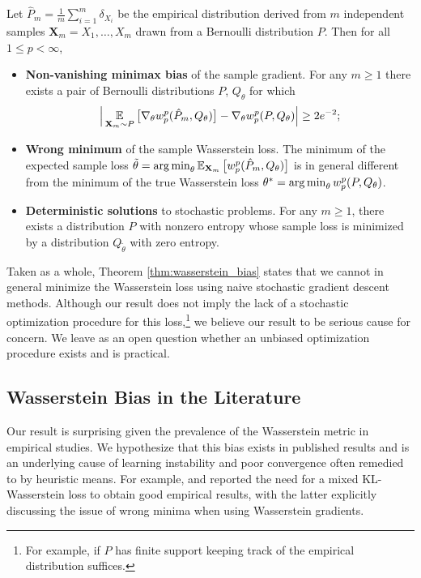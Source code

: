\documentclass{article}
\def \gradtheta {{\grad_\theta}}
\def \batch {\mathbf{X}_m}
\begin{document}
\begin{thm}\label{thm:wasserstein_bias}
Let $\hat P_m=\frac 1m\sum_{i=1}^m \delta_{X_i}$ be the empirical distribution derived from $m$ independent samples $\batch = X_1,\dots, X_m$ drawn from a Bernoulli distribution $P$. Then for all $1 \le p < \infty$,
\begin{itemize}[leftmargin=4ex,topsep=0pt,itemsep=-1ex,partopsep=1ex,parsep=1ex]
\item {\bf Non-vanishing minimax bias} of the sample gradient. For any $m \ge 1$ there exists a pair of Bernoulli distributions $P$, $Q_\theta$ for which
\begin{equation*}
\Big| \expect_{\batch \sim P} \big[ \gradtheta w^p_p(\hat P_m, Q_\theta)\big] - \gradtheta w^p_p(P, Q_\theta) \Big| \ge 2e^{-2};
%
\end{equation*}

\item {\bf Wrong minimum} of the sample Wasserstein loss. The minimum of the expected sample loss $\tilde\theta = \argmin_\theta \expects_{\batch} \big[ w^p_p(\hat P_m, Q_\theta)\big]$ is in general different from the minimum of the true Wasserstein loss $\theta^*=\operatorname*{arg\,min}_\theta w^p_p(P, Q_\theta)$.

\item {\bf Deterministic solutions} to stochastic problems. For any $m \ge 1$, there exists a distribution $P$ with nonzero entropy whose sample loss is minimized by a 
distribution $Q_{\tilde \theta}$ with zero entropy.
\end{itemize}
\end{thm}
Taken as a whole, Theorem \ref{thm:wasserstein_bias} states that we cannot in general minimize the Wasserstein loss using naive stochastic gradient descent methods. Although our result does not imply the lack of a stochastic optimization procedure for this loss,\footnote{For example, if $P$ has finite support keeping track of the empirical distribution suffices.} we believe our result to be serious cause for concern.
We leave as an open question whether an unbiased optimization procedure exists and is practical.
%

\subsection*{Wasserstein Bias in the Literature}

Our result is surprising given the prevalence of the Wasserstein metric in empirical studies. We hypothesize that this bias exists in published results and is an underlying cause of learning instability and poor convergence often remedied to by heuristic means. For example,  \citet{frogner15learning} and \citet{montavon2016wasserstein} reported the need for a mixed KL-Wasserstein loss to obtain good empirical results, with the latter explicitly discussing the issue of wrong minima when using Wasserstein gradients.
%
\end{document}
